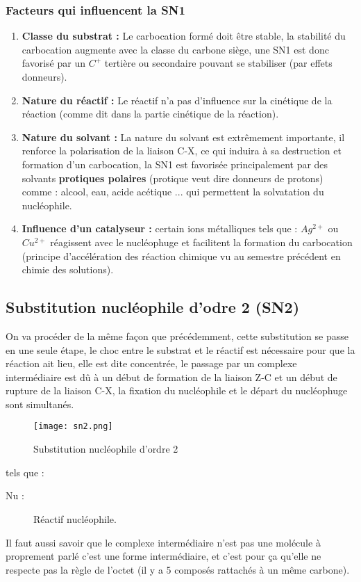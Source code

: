 \documentclass[a4paper, oneside]{book}
\begin{document}
\subsubsection{Facteurs qui influencent la SN1}
\begin{enumerate}
    \item \textbf{Classe du substrat :} Le carbocation formé doit être stable, la stabilité du carbocation augmente avec la classe du carbone siège, une SN1 est donc favorisé par un $C^+$ tertière ou secondaire pouvant se stabiliser (par effets donneurs).
    \item \textbf{Nature du réactif :} Le réactif n'a pas d'influence sur la cinétique de la réaction (comme dit dans la partie cinétique de la réaction).
    \item \textbf{Nature du solvant :} La nature du solvant est extrêmement importante, il renforce la polarisation de la liaison C-X, ce qui induira à sa destruction et formation d'un carbocation, la SN1 est favorisée principalement par des solvants \textbf{protiques polaires} (protique veut dire donneurs de protons) comme : alcool, eau, acide acétique ... qui permettent la solvatation du nucléophile.
    \item \textbf{Influence d'un catalyseur :} certain ions métalliques tels que : $Ag^{2+}$ ou $Cu^{2+}$ réagissent avec le nucléophuge et facilitent la formation du carbocation (principe d'accélération des réaction chimique vu au semestre précédent en chimie des solutions). 
\end{enumerate}
\subsection{Substitution nucléophile d'odre 2 (SN2)}
On va procéder de la même façon que précédemment, cette substitution se passe en une seule étape, le choc entre le substrat et le réactif est nécessaire pour que la réaction ait lieu, elle est dite concentrée, le passage par un complexe intermédiaire est dû à un début de formation de la liaison Z-C et un début de rupture de la liaison C-X, la fixation du nucléophile et le départ du nucléophuge sont simultanés.
\begin{figure}[!h]
    \centering
    \texttt{[image: sn2.png]}
    \caption{Substitution nucléophile d'ordre 2}
    \label{fig:my_label}
\end{figure}
\newpage
tels que :
\begin{description}
    \item[Nu :] Réactif nucléophile.
\end{description}
Il faut aussi savoir que le complexe intermédiaire n'est pas une molécule à proprement parlé c'est une forme intermédiaire, et c'est pour ça qu'elle ne respecte pas la règle de l'octet (il y a 5 composés rattachés à un même carbone).
\end{document}
